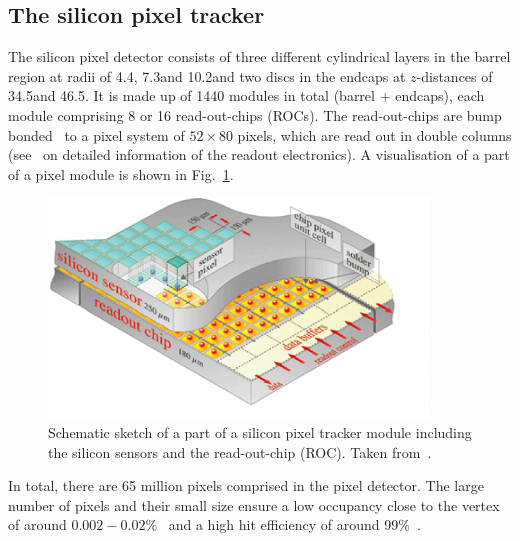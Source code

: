 \subsection*{The silicon pixel tracker}
The silicon pixel detector consists of three different cylindrical layers in the barrel region at radii of 4.4\cm, 7.3\cm and 10.2\cm and two discs in the endcaps at $z$-distances of 34.5\cm and 46.5\cm.
It is made up of 1440 modules in total (barrel + endcaps), each module comprising 8 or 16 read-out-chips (ROCs).
The read-out-chips are bump bonded~\cite{Thesis_Jenny} to a pixel system of $52\times80$ pixels, which are read out in double columns (see~\cite{Thesis_Jenny} on detailed information of the readout electronics).
A visualisation of a part of a pixel module is shown in Fig.~\ref{fig:PixelTracker}.
\begin{figure}[!b]
  \centering
      \includegraphics[width=0.90\textwidth]{figures/experiment/CMS/Pixelement.png}
  \caption{Schematic sketch of a part of a silicon pixel tracker module including the silicon sensors and the read-out-chip (ROC). Taken from~\cite{bib:CMS:tracking_8TeV}.}  
  \label{fig:PixelTracker}
\end{figure}
In total, there are 65 million pixels comprised in the pixel detector.
The large number of pixels and their small size ensure a low occupancy close to the vertex of around $0.002 - 0.02$\%~\cite{bib:CMS:tracking_8TeV} and a high hit efficiency of around 99\%~\cite{bib:CMS:PixelSpatialResolution}. 

